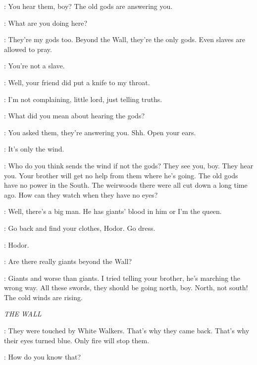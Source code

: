 \OSHA: You hear them, boy? The old gods are answering you. 

\BRAN: What are you doing here? 

\OSHA: They're my gods too. Beyond the Wall, they're the only gods. Even slaves are allowed to pray. 

\BRAN: You're not a slave. 


\BRAN: Well, your friend did put a knife to my throat. 

\OSHA: I'm not complaining, little lord, just telling truths. 

\BRAN: What did you mean about hearing the gods? 

\OSHA: You asked them, they're answering you. Shh. Open your ears. 


\BRAN: It's only the wind. 

\OSHA: Who do you think sends the wind if not the gods? They see you, boy. They hear you. Your brother will get no help from them where he's going. The old gods have no power in the South. The weirwoods there were all cut down a long time ago. How can they watch when they have no eyes? 


\OSHA: Well, there's a big man. He has giants' blood in him or I'm the queen. 

\BRAN: Go back and find your clothes, Hodor. Go dress. 

\HODOR: Hodor. 

\BRAN: Are there really giants beyond the Wall? 

\OSHA: Giants and worse than giants. I tried telling your brother, he's marching the wrong way. All these swords, they should be going north, boy. North, not south! The cold winds are rising.



\scene

\textit{THE WALL} 


\SAM: They were touched by White Walkers. That's why they came back. That's why their eyes turned blue. Only fire will stop them. 

\JON: How do you know that? 

